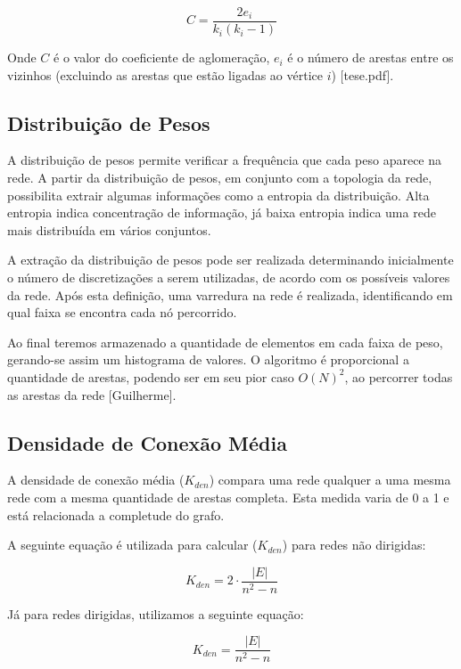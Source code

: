 \documentclass[xindy,rascunho]{fei}
\begin{document}
\begin{equation} \label{eq:CoefAglomeracao}
C = \frac{2e_i}{k_i(k_i - 1)}
\end{equation}

Onde $C$ é o valor do coeficiente de aglomeração, $e_i$ é o número de arestas entre os vizinhos (excluindo as arestas que estão ligadas ao vértice $i$) [tese.pdf].

\subsection{Distribuição de Pesos }
A distribuição de pesos permite verificar a frequência que cada peso aparece na rede. A partir da distribuição de pesos, em conjunto com a topologia da rede, possibilita extrair algumas informações como a entropia da distribuição. Alta entropia indica concentração de informação, já baixa entropia indica uma rede mais distribuída em vários conjuntos.

A extração da distribuição de pesos pode ser realizada determinando inicialmente o número de discretizações a serem utilizadas, de acordo com os possíveis valores da rede. Após esta definição, uma varredura na rede é realizada, identificando em qual faixa se encontra cada nó percorrido. 

Ao final teremos armazenado a quantidade de elementos em cada faixa de peso, gerando-se assim um histograma de valores.
O algoritmo é proporcional a quantidade de arestas, podendo ser em seu pior caso $O(N)^2$, ao percorrer todas as arestas da rede [Guilherme].

\subsection{Densidade de Conexão Média}
A densidade de conexão média ($K_{den}$) compara uma rede qualquer a uma mesma rede com a mesma quantidade de arestas completa. Esta medida varia de 0 a 1 e está relacionada a completude do grafo.

A seguinte equação é utilizada para calcular ($K_{den}$) para redes não dirigidas:

\begin{equation} \label{eq:DensidadeNaoDirigida}
K_{den} = 2 \cdot \frac{|E|}{n^2 - n}
\end{equation}

Já para redes dirigidas, utilizamos a seguinte equação:

\begin{equation} \label{eq:DensidadeDirigida}
K_{den} = \frac{|E|}{n^2 - n}
\end{equation}
\end{document}
